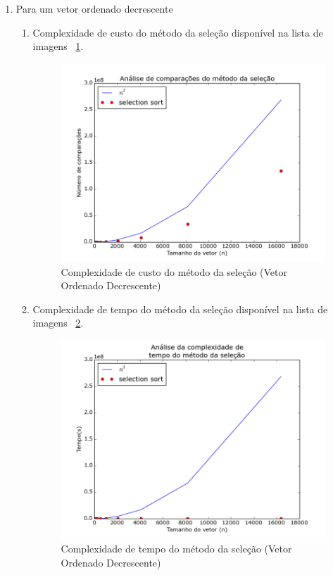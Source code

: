 \documentclass[12pt,a4paper,twoside]{report}
\begin{document}
\begin{enumerate}
\begin{enumerate}
		\end{enumerate}



		\item Para um vetor ordenado decrescente
				\begin{enumerate}
					\item Complexidade de custo do método da seleção disponível na lista de imagens ~\ref{fig:SelectionPlot1OD}.
					\begin{figure}[!h]
						\centering
						\includegraphics[scale=0.6]{../imagens/Selection/selection_plot_1_ordenado_decrescente.png}
						\caption{Complexidade de custo do método da seleção (Vetor Ordenado Decrescente) \label{fig:SelectionPlot1OD}}
					\end{figure}


					\item Complexidade de tempo do método da seleção disponível na lista de imagens ~\ref{fig:SelectionPlot2OD}.
					\begin{figure}[!h]
						\centering
						\includegraphics[scale=0.6]{../imagens/Selection/selection_plot_2_ordenado_decrescente.png}
						\caption{Complexidade de tempo do método da seleção (Vetor Ordenado Decrescente) \label{fig:SelectionPlot2OD}}
					\end{figure}



\end{enumerate}
\end{enumerate}
\end{document}
